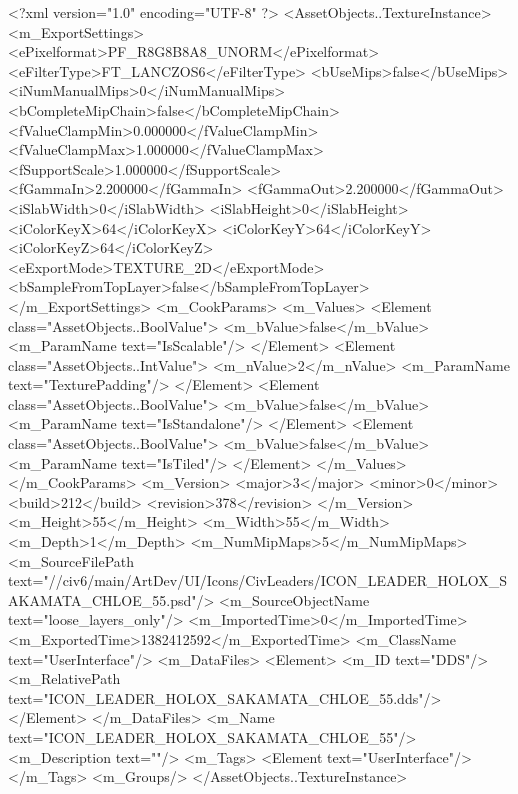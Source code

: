 <?xml version="1.0" encoding="UTF-8" ?>
<AssetObjects..TextureInstance>
	<m_ExportSettings>
		<ePixelformat>PF_R8G8B8A8_UNORM</ePixelformat>
		<eFilterType>FT_LANCZOS6</eFilterType>
		<bUseMips>false</bUseMips>
		<iNumManualMips>0</iNumManualMips>
		<bCompleteMipChain>false</bCompleteMipChain>
		<fValueClampMin>0.000000</fValueClampMin>
		<fValueClampMax>1.000000</fValueClampMax>
		<fSupportScale>1.000000</fSupportScale>
		<fGammaIn>2.200000</fGammaIn>
		<fGammaOut>2.200000</fGammaOut>
		<iSlabWidth>0</iSlabWidth>
		<iSlabHeight>0</iSlabHeight>
		<iColorKeyX>64</iColorKeyX>
		<iColorKeyY>64</iColorKeyY>
		<iColorKeyZ>64</iColorKeyZ>
		<eExportMode>TEXTURE_2D</eExportMode>
		<bSampleFromTopLayer>false</bSampleFromTopLayer>
	</m_ExportSettings>
	<m_CookParams>
		<m_Values>
			<Element class="AssetObjects..BoolValue">
				<m_bValue>false</m_bValue>
				<m_ParamName text="IsScalable"/>
			</Element>
			<Element class="AssetObjects..IntValue">
				<m_nValue>2</m_nValue>
				<m_ParamName text="TexturePadding"/>
			</Element>
			<Element class="AssetObjects..BoolValue">
				<m_bValue>false</m_bValue>
				<m_ParamName text="IsStandalone"/>
			</Element>
			<Element class="AssetObjects..BoolValue">
				<m_bValue>false</m_bValue>
				<m_ParamName text="IsTiled"/>
			</Element>
		</m_Values>
	</m_CookParams>
	<m_Version>
		<major>3</major>
		<minor>0</minor>
		<build>212</build>
		<revision>378</revision>
	</m_Version>
	<m_Height>55</m_Height>
	<m_Width>55</m_Width>
	<m_Depth>1</m_Depth>
	<m_NumMipMaps>5</m_NumMipMaps>
	<m_SourceFilePath text="//civ6/main/ArtDev/UI/Icons/CivLeaders/ICON_LEADER_HOLOX_SAKAMATA_CHLOE_55.psd"/>
	<m_SourceObjectName text="loose_layers_only"/>
	<m_ImportedTime>0</m_ImportedTime>
	<m_ExportedTime>1382412592</m_ExportedTime>
	<m_ClassName text="UserInterface"/>
	<m_DataFiles>
		<Element>
			<m_ID text="DDS"/>
			<m_RelativePath text="ICON_LEADER_HOLOX_SAKAMATA_CHLOE_55.dds"/>
		</Element>
	</m_DataFiles>
	<m_Name text="ICON_LEADER_HOLOX_SAKAMATA_CHLOE_55"/>
	<m_Description text=""/>
	<m_Tags>
		<Element text="UserInterface"/>
	</m_Tags>
	<m_Groups/>
</AssetObjects..TextureInstance>

